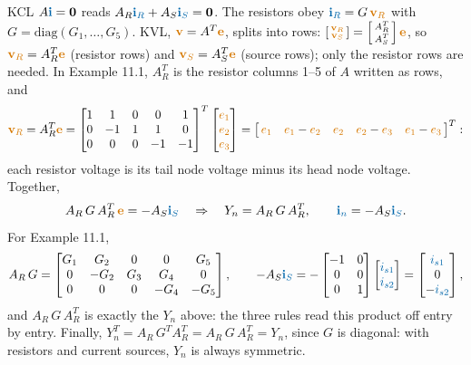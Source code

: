 \documentclass[11pt,a4paper]{article}
\newcommand{\Icol}[1]{\textcolor{ccur}{#1}}
\newcommand{\Vcol}[1]{\textcolor{cvolt}{#1}}
\newcommand{\e}[1]{\textcolor{cvolt}{e_{#1}}}
\begin{document}
KCL $A\Icol{\mathbf{i}} = \mathbf{0}$ reads $A_R\Icol{\mathbf{i}_R} + A_S\Icol{\mathbf{i}_S} = \mathbf{0}$.
The resistors obey $\Icol{\mathbf{i}_R} = G\,\Vcol{\mathbf{v}_R}$ with
$G = \mathrm{diag}(G_1, \dots, G_5)$. KVL, $\Vcol{\mathbf{v}} = A^T\Vcol{\mathbf{e}}$, splits into rows:
$\left[\begin{smallmatrix} \Vcol{\mathbf{v}_R}\\ \Vcol{\mathbf{v}_S} \end{smallmatrix}\right]
= \left[\begin{smallmatrix} A_R^T\\ A_S^T \end{smallmatrix}\right]\Vcol{\mathbf{e}}$, so
$\Vcol{\mathbf{v}_R} = A_R^T\Vcol{\mathbf{e}}$ (resistor rows) and
$\Vcol{\mathbf{v}_S} = A_S^T\Vcol{\mathbf{e}}$ (source rows); only the resistor rows are needed. In
Example 11.1, $A_R^T$ is the resistor columns 1--5 of $A$ written as rows, and
\[
  \Vcol{\mathbf{v}_R} = A_R^T\Vcol{\mathbf{e}}
  = \begin{bmatrix}
    1 & 1 & 0 & 0 & 1\\
    0 & -1 & 1 & 1 & 0\\
    0 & 0 & 0 & -1 & -1
  \end{bmatrix}^T
  \begin{bmatrix} \e{1}\\ \e{2}\\ \e{3} \end{bmatrix}
  = \big[\, \e{1} \ \ \ \e{1} - \e{2} \ \ \ \e{2} \ \ \ \e{2} - \e{3} \ \ \ \e{1} - \e{3} \,\big]^T :
\]
each resistor voltage is its tail node voltage minus its head node voltage. Together,
\[
  A_R\,G\,A_R^T\,\Vcol{\mathbf{e}} = -A_S\Icol{\mathbf{i}_S}
  \quad\Rightarrow\quad
  Y_n = A_R\,G\,A_R^T, \qquad \Icol{\mathbf{i}_n} = -A_S\Icol{\mathbf{i}_S}.
\]
For Example 11.1,
\[
  A_R\,G = \begin{bmatrix}
      G_1 & G_2 & 0 & 0 & G_5\\
      0 & -G_2 & G_3 & G_4 & 0\\
      0 & 0 & 0 & -G_4 & -G_5
    \end{bmatrix},
  \qquad
  -A_S\Icol{\mathbf{i}_S}
    = -\begin{bmatrix} -1 & 0\\ 0 & 0\\ 0 & 1 \end{bmatrix}
       \begin{bmatrix} \Icol{i_{s1}}\\ \Icol{i_{s2}} \end{bmatrix}
    = \begin{bmatrix} \Icol{i_{s1}}\\ 0\\ -\Icol{i_{s2}} \end{bmatrix},
\]
and $A_R\,G\,A_R^T$ is exactly the $Y_n$ above: the three rules read this product off entry by
entry. Finally, $Y_n^T = A_R\,G^T A_R^T = A_R\,G\,A_R^T = Y_n$, since $G$ is diagonal: with
resistors and current sources, $Y_n$ is always symmetric.
\end{document}
